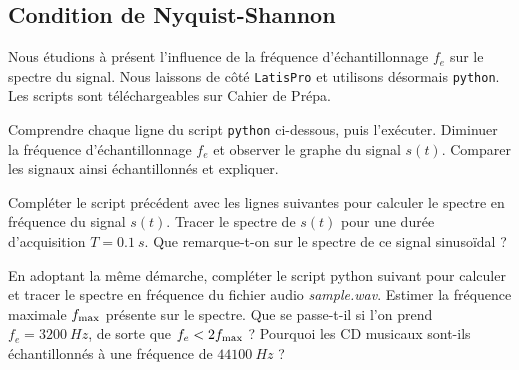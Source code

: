 \subsection{Condition de Nyquist-Shannon}
Nous étudions à présent l’influence de la fréquence d’échantillonnage $f_e$ sur le spectre du signal. Nous laissons de côté \texttt{LatisPro} et utilisons désormais \texttt{python}. Les scripts sont téléchargeables sur Cahier de Prépa.

 \begin{protocole}
 \item Comprendre chaque ligne du script \texttt{python} ci-dessous, puis l'exécuter.
Diminuer la fréquence d'échantillonnage $f_e$ et observer le graphe du signal $s(t)$.
 Comparer les signaux ainsi échantillonnés et expliquer.

\item Compléter le script précédent  avec les lignes suivantes pour calculer le spectre en fréquence du signal $s(t)$.
Tracer le spectre de $s(t)$ pour une durée d'acquisition $T=\SI{0.1}{s}$.
Que remarque-t-on sur le spectre de ce signal sinusoïdal ?

 \item  En adoptant la même démarche, compléter le script python suivant pour calculer et tracer le spectre en fréquence du fichier audio \emph{sample.wav}.
 Estimer la fréquence maximale  $f_{\rm max}$ présente sur le spectre. Que se passe-t-il si l'on prend $f_e=\SI{3200}{Hz}$, de sorte que $f_e < 2f_{\rm max}$ ? Pourquoi les CD musicaux sont-ils échantillonnés à une fréquence de $\SI{44 100}{Hz}$ ?

 \end{protocole}


